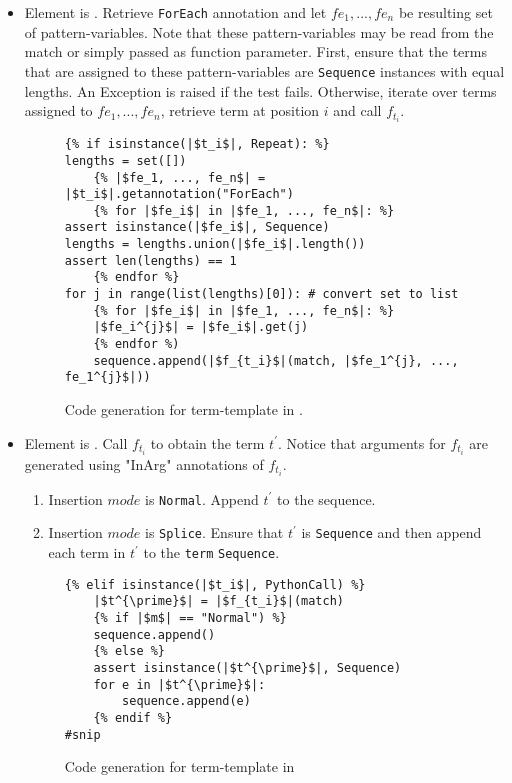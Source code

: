 \begin{itemize}
\item
Element is \TermRepeat. Retrieve \texttt{ForEach} annotation and let $fe_1, ..., fe_n$ be resulting set of pattern-variables. Note that these pattern-variables may be read from the match or simply passed as function parameter. First, ensure that the terms that are assigned to these pattern-variables are \texttt{Sequence} instances with equal lengths. An Exception is raised if the test fails. Otherwise, iterate over terms assigned to $fe_1, ..., fe_n$, retrieve term at position $i$ and call $f_{t_i}$.

\begin{figure}
\begin{verbatim}
{% if isinstance(|$t_i$|, Repeat): %}
lengths = set([])
	{% |$fe_1, ..., fe_n$| = |$t_i$|.getannotation("ForEach")
	{% for |$fe_i$| in |$fe_1, ..., fe_n$|: %}
assert isinstance(|$fe_i$|, Sequence)
lengths = lengths.union(|$fe_i$|.length())
assert len(lengths) == 1
	{% endfor %}
for j in range(list(lengths)[0]): # convert set to list 
	{% for |$fe_i$| in |$fe_1, ..., fe_n$|: %}
	|$fe_i^{j}$| = |$fe_i$|.get(j)
	{% endfor %)
	sequence.append(|$f_{t_i}$|(match, |$fe_1^{j}, ..., fe_1^{j}$|))
\end{verbatim}
\caption{Code generation for term-template \RepeatNoArg \space in \TermSequenceNoArg.}
\label{codegen-term-sequence-repeat}
\end{figure}

\item
Element is \PythonCall. Call $f_{t_i}$ to obtain the term $t^{\prime}$. Notice that arguments for $f_{t_i}$ are generated using "InArg" annotations of $f_{t_i}$. 
	\begin{enumerate}
	\item Insertion $mode$ is \texttt{Normal}. Append $t^{\prime}$ to the sequence.
	\item Insertion $mode$ is \texttt{Splice}. Ensure that $t^{\prime}$ is \texttt{Sequence} and then append each term in $t^{\prime}$ to the \texttt{term} \texttt{Sequence}.
	\end{enumerate}

\begin{figure}
\begin{verbatim}
{% elif isinstance(|$t_i$|, PythonCall) %}
	|$t^{\prime}$| = |$f_{t_i}$|(match)
	{% if |$m$| == "Normal") %}
	sequence.append()
	{% else %}
	assert isinstance(|$t^{\prime}$|, Sequence)
	for e in |$t^{\prime}$|:
		sequence.append(e)
	{% endif %}
#snip
\end{verbatim}
\caption{Code generation for term-template \PythonCallNoArg \space in \TermSequenceNoArg}
\label{codegen-term-sequence-pycall}
\end{figure}


\end{itemize}
